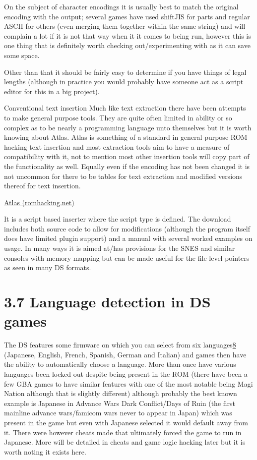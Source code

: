 \documentclass[
]{book}
\begin{document}
On the subject of character encodings it is usually best to match the original encoding with the output; several games have used shiftJIS for parts and regular ASCII for others (even merging them together within the same string) and will complain a lot if it is not that way when it it comes to being run, however this is one thing that is definitely worth checking out/experimenting with as it can save some space.

Other than that it should be fairly easy to determine if you have things of legal lengths (although in practice you would probably have someone act as a script editor for this in a big project).

Conventional text insertion Much like text extraction there have been attempts to make general purpose tools. They are quite often limited in ability or so complex as to be nearly a programming language unto themselves but it is worth knowing about Atlas. Atlas is something of a standard in general purpose ROM hacking text insertion and most extraction tools aim to have a measure of compatibility with it, not to mention most other insertion tools will copy part of the functionality as well. Equally even if the encoding has not been changed it is not uncommon for there to be tables for text extraction and modified versions thereof for text insertion.

\href{http://www.romhacking.net/reviews/62/}{Atlas (romhacking.net)}

It is a script based inserter where the script type is defined. The download includes both source code to allow for modifications (although the program itself does have limited plugin support) and a manual with several worked examples on usage. In many ways it is aimed at/has provisions for the SNES and similar consoles with memory mapping but can be made useful for the file level pointers as seen in many DS formats.

\hypertarget{language-detection-in-ds-games}{%
\section{3.7 Language detection in DS games}\label{language-detection-in-ds-games}}

The DS features some firmware on which you can select from six languages\href{romhacking20209.html\#fn8x0}{8} (Japanese, English, French, Spanish, German and Italian) and games then have the ability to automatically choose a language. More than once have various languages been locked out despite being present in the ROM (there have been a few GBA games to have similar features with one of the most notable being Magi Nation although that is slightly different) although probably the best known example is Japanese in Advance Wars Dark Conflict/Days of Ruin (the first mainline advance wars/famicom wars never to appear in Japan) which was present in the game but even with Japanese selected it would default away from it. There were however cheats made that ultimately forced the game to run in Japanese. More will be detailed in cheats and game logic hacking later but it is worth noting it exists here.
\end{document}

